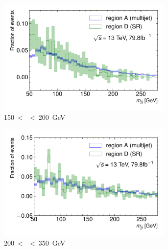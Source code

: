 \begin{figure}[htbp]
  \centering
  \begin{subfigure}{0.45\textwidth}
    \centering
    \includegraphics[width=0.95\textwidth]{figures/monoH/multijet/monoHmultijet_correlation-mass_SR_Resolved_150_200_2b.pdf}
    \caption{\SI{150} < \met < \SI{200}{\giga\electronvolt}}
  \end{subfigure}%
  \begin{subfigure}{0.45\textwidth}
    \centering
    \includegraphics[width=0.95\textwidth]{figures/monoH/multijet/monoHmultijet_correlation-mass_SR_Resolved_200_350_2b.pdf}
    \caption{\SI{200} < \met < \SI{350}{\giga\electronvolt}}
  \end{subfigure}
  \\
  \begin{subfigure}{0.45\textwidth}
    \centering

\end{subfigure}
\end{figure}
